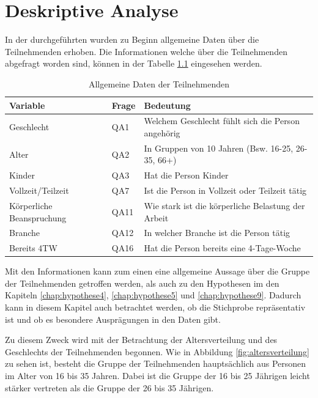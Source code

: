 \chapter{Deskriptive Analyse}

In der durchgeführten wurden zu Beginn allgemeine Daten über die Teilnehmenden erhoben.
Die Informationen welche über die Teilnehmenden abgefragt worden sind, können in der Tabelle
\ref{tab:allgemeine_daten} eingesehen werden.

\begin{table}[h]
    \centering
    \begin{tabular}{|l|l|p{8cm}|}
        \hline
        \textbf{Variable} & \textbf{Frage} & \textbf{Bedeutung}\\
        \hline
        Geschlecht & QA1 & Welchem Geschlecht fühlt sich die Person angehörig\\
        Alter & QA2 & In Gruppen von 10 Jahren (Bsw. 16-25, 26-35, 66+)\\
        Kinder & QA3 & Hat die Person Kinder\\
        Vollzeit/Teilzeit & QA7 & Ist die Person in Vollzeit oder Teilzeit tätig\\
        Körperliche Beanspruchung & QA11 & Wie stark ist die körperliche Belastung der Arbeit\\
        Branche & QA12 & In welcher Branche ist die Person tätig\\
        Bereits 4TW & QA16 & Hat die Person bereits eine 4-Tage-Woche\\
        \hline
    \end{tabular}
    \caption{Allgemeine Daten der Teilnehmenden}
    \label{tab:allgemeine_daten}
\end{table}

Mit den Informationen kann zum einen eine allgemeine Aussage über die Gruppe der Teilnehmenden 
getroffen werden, als auch zu den Hypothesen im den Kapiteln \ref{chap:hypothese4},
\ref{chap:hypothese5} und \ref{chap:hypothese9}. Dadurch kann in diesem Kapitel auch betrachtet
werden, ob die Stichprobe repräsentativ ist und ob es besondere Ausprägungen in den Daten gibt.
 
Zu diesem Zweck wird mit der Betrachtung der Altersverteilung und des Geschlechts der Teilnehmenden begonnen.
Wie in Abbildung \ref{fig:altersverteilung} zu sehen ist, besteht die Gruppe der Teilnehmenden hauptsächlich aus Personen im Alter von 16 bis 35 Jahren.
Dabei ist die Gruppe der 16 bis 25 Jährigen leicht stärker vertreten als die Gruppe der 26 bis 35 Jährigen.

